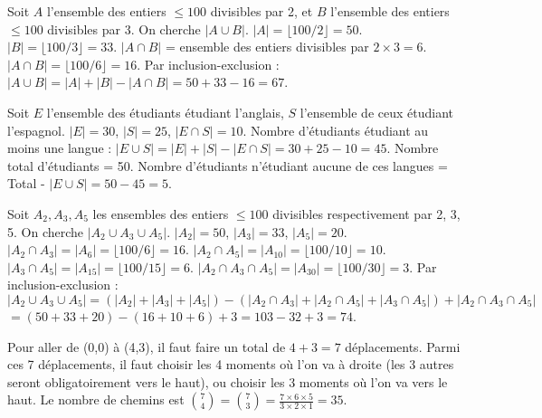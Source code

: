 \begin{correctionbox}
Soit $A$ l'ensemble des entiers $\le 100$ divisibles par 2, et $B$ l'ensemble des entiers $\le 100$ divisibles par 3. On cherche $|A \cup B|$.
$|A| = \lfloor 100/2 \rfloor = 50$.
$|B| = \lfloor 100/3 \rfloor = 33$.
$|A \cap B|$ = ensemble des entiers divisibles par $2 \times 3 = 6$. $|A \cap B| = \lfloor 100/6 \rfloor = 16$.
Par inclusion-exclusion : $|A \cup B| = |A| + |B| - |A \cap B| = 50 + 33 - 16 = 67$.
\end{correctionbox}

\begin{correctionbox}
Soit $E$ l'ensemble des étudiants étudiant l'anglais, $S$ l'ensemble de ceux étudiant l'espagnol.
$|E| = 30$, $|S| = 25$, $|E \cap S| = 10$.
Nombre d'étudiants étudiant au moins une langue : $|E \cup S| = |E| + |S| - |E \cap S| = 30 + 25 - 10 = 45$.
Nombre total d'étudiants = 50.
Nombre d'étudiants n'étudiant aucune de ces langues = Total - $|E \cup S| = 50 - 45 = 5$.
\end{correctionbox}

\begin{correctionbox}
Soit $A_2, A_3, A_5$ les ensembles des entiers $\le 100$ divisibles respectivement par 2, 3, 5. On cherche $|A_2 \cup A_3 \cup A_5|$.
$|A_2|=50$, $|A_3|=33$, $|A_5|=20$.
$|A_2 \cap A_3| = |A_6| = \lfloor 100/6 \rfloor = 16$.
$|A_2 \cap A_5| = |A_{10}| = \lfloor 100/10 \rfloor = 10$.
$|A_3 \cap A_5| = |A_{15}| = \lfloor 100/15 \rfloor = 6$.
$|A_2 \cap A_3 \cap A_5| = |A_{30}| = \lfloor 100/30 \rfloor = 3$.
Par inclusion-exclusion :
$|A_2 \cup A_3 \cup A_5| = (|A_2|+|A_3|+|A_5|) - (|A_2 \cap A_3|+|A_2 \cap A_5|+|A_3 \cap A_5|) + |A_2 \cap A_3 \cap A_5|$
$= (50+33+20) - (16+10+6) + 3 = 103 - 32 + 3 = 74$.
\end{correctionbox}


\begin{correctionbox}
Pour aller de (0,0) à (4,3), il faut faire un total de $4+3=7$ déplacements. Parmi ces 7 déplacements, il faut choisir les 4 moments où l'on va à droite (les 3 autres seront obligatoirement vers le haut), ou choisir les 3 moments où l'on va vers le haut.
Le nombre de chemins est $\binom{7}{4} = \binom{7}{3} = \frac{7 \times 6 \times 5}{3 \times 2 \times 1} = 35$.
\end{correctionbox}

